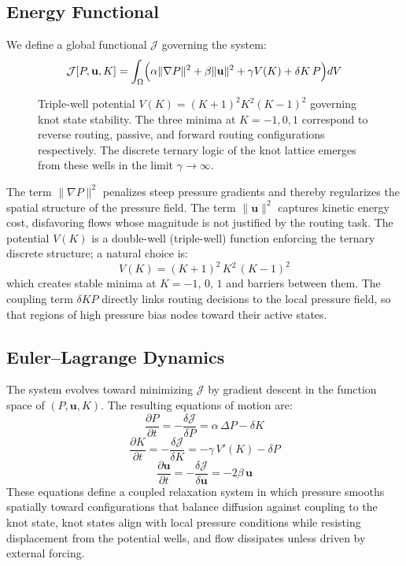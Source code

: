 \documentclass[12pt, a4paper]{article}
\begin{document}
\subsection{Energy Functional}

We define a global functional $\mathcal{J}$ governing the system:
\[
\mathcal{J}[P,\mathbf{u},K] =
\int_{\Omega}
\Bigl(
\alpha \|\nabla P\|^2
+ \beta \|\mathbf{u}\|^2
+ \gamma V(K)
+ \delta K\, P
\Bigr) dV
\]

\begin{figure}[h]
\centering
{}
\caption{Triple-well potential $V(K) = (K+1)^2 K^2 (K-1)^2$ governing knot state stability. The three minima at $K = -1, 0, 1$ correspond to reverse routing, passive, and forward routing configurations respectively. The discrete ternary logic of the knot lattice emerges from these wells in the limit $\gamma \to \infty$.}
\end{figure}

The term $\|\nabla P\|^2$ penalizes steep pressure gradients and thereby regularizes the spatial structure of the pressure field. The term $\|\mathbf{u}\|^2$ captures kinetic energy cost, disfavoring flows whose magnitude is not justified by the routing task. The potential $V(K)$ is a double-well (triple-well) function enforcing the ternary discrete structure; a natural choice is:
\[
V(K) = (K+1)^2\, K^2\, (K-1)^2
\]
which creates stable minima at $K = -1,\, 0,\, 1$ and barriers between them. The coupling term $\delta K P$ directly links routing decisions to the local pressure field, so that regions of high pressure bias nodes toward their active states.

\subsection{Euler--Lagrange Dynamics}

The system evolves toward minimizing $\mathcal{J}$ by gradient descent in the function space of $(P, \mathbf{u}, K)$. The resulting equations of motion are:
\[
\frac{\partial P}{\partial t} = -\frac{\delta \mathcal{J}}{\delta P} = \alpha\, \Delta P - \delta K
\]
\[
\frac{\partial K}{\partial t} = -\frac{\delta \mathcal{J}}{\delta K} = -\gamma\, V'(K) - \delta P
\]
\[
\frac{\partial \mathbf{u}}{\partial t} = -\frac{\delta \mathcal{J}}{\delta \mathbf{u}} = -2\beta\, \mathbf{u}
\]
These equations define a coupled relaxation system in which pressure smooths spatially toward configurations that balance diffusion against coupling to the knot state, knot states align with local pressure conditions while resisting displacement from the potential wells, and flow dissipates unless driven by external forcing.
\end{document}
